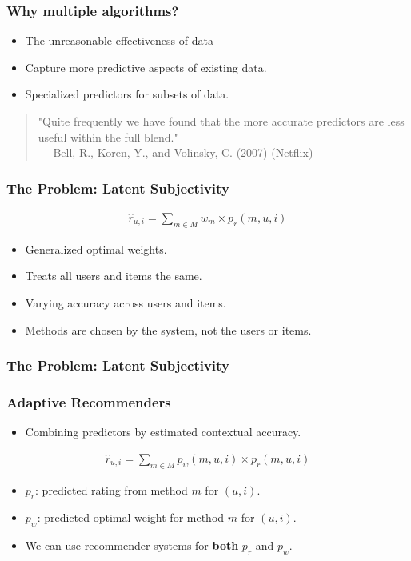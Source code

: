 \documentclass[screen]{beamer}
\begin{document}
\begin{frame}
  \frametitle{Why multiple algorithms?}
  \begin{itemize}
    \item The unreasonable effectiveness of data
    \item Capture more predictive aspects of existing data.
    \item Specialized predictors for subsets of data.
  \end{itemize}
  \vspace{2em}
  \begin{quote}
    "Quite frequently we have found that the more accurate predictors are less useful within the full blend."\\
    --- Bell, R., Koren, Y., and Volinsky, C. (2007) (Netflix)
  \end{quote}  
\end{frame}

\begin{frame}
  \frametitle{The Problem: Latent Subjectivity}
  \begin{eqnarray}
    \hat{r}_{u,i} = \sum_{m \in M} w_{m} \times p_{r}(m,u,i)
  \end{eqnarray}
  \begin{itemize}
    \item Generalized optimal weights.
    \item Treats all users and items the same.
    \item Varying accuracy across users and items.
    \item Methods are chosen by the system, not the users or items.
  \end{itemize}
\end{frame}

\begin{frame}
  \frametitle{The Problem: Latent Subjectivity}
  \huge
  \linespread{2}{
    Systems that insist on being adaptive in a certain way
    are not really adaptive at all.
  }
\end{frame}

\begin{frame}
  \frametitle{Adaptive Recommenders}
  \begin{itemize}
    \item Combining predictors by estimated contextual accuracy.
  \end{itemize}
  \begin{eqnarray}
    \hat{r}_{u,i} = \sum_{m \in M} p_{w}(m,u,i) \times p_{r}(m,u,i)
  \end{eqnarray}
  \begin{itemize}
    \item $p_r$: predicted rating from method $m$ for $(u,i)$.
    \item $p_w$: predicted optimal weight for method $m$ for $(u,i)$.
    \item We can use recommender systems for \textbf{both} $p_r$ and $p_w$.
  \end{itemize}
\end{frame}
\end{document}
